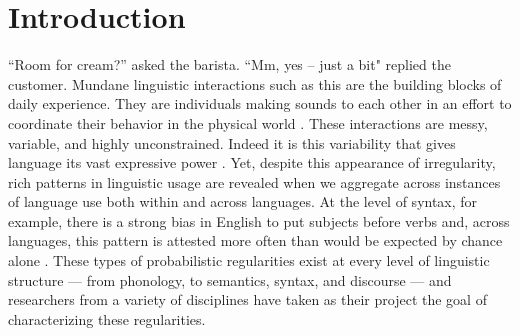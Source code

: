 
\chapter{Introduction}
\label{chapter:introduction}


``Room for cream?'' asked the barista. ``Mm, yes -- just a bit" replied the customer. Mundane linguistic interactions such as this are the building blocks of daily experience. They are individuals making sounds to each other in an effort to coordinate their behavior in the physical world \cite{clark2006social}. These interactions are messy, variable, and highly unconstrained. Indeed it is this variability that gives language its vast expressive power \cite{hockett1960}. Yet, despite this appearance of irregularity, rich patterns in linguistic usage are revealed when we aggregate across instances of language use both within and across languages. At the level of syntax, for example, there is a strong bias in English to put subjects before verbs and, across languages, this pattern is attested more often than would be expected by chance alone  \cite{dryer2005order}. These types of probabilistic regularities exist at every level of linguistic structure --- from phonology, to semantics, syntax, and discourse --- and researchers from a variety of disciplines have taken as their project the goal of characterizing these regularities.


